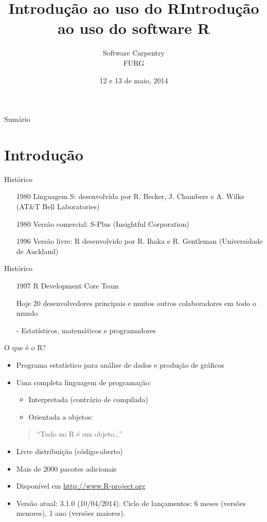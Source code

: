 \documentclass[10pt,handout]{beamer}\usepackage[]{graphicx}\usepackage[]{color}
\title{Introdução ao uso do R}
\title[Módulo I\\ Básico]{Introdução ao uso do software R}
\author{Software Carpentry\\ FURG}
\date{12 e 13 de maio, 2014}
\begin{document}
\begin{frame}
\maketitle
\end{frame}

\begin{frame}{Sumário}
\tableofcontents
\end{frame}

\section{Introdução}

\begin{frame}{Histórico}
\begin{itemize}
\item[1980] Linguagem S: desenvolvida por R. Becker, J. Chambers e
  A. Wilks (AT\&T Bell Laboratories)
\item[1980] Versão comercial: S-Plus (Insightful Corporation)
\item[1996] Versão livre: R desenvolvido por R. Ihaka e R. Gentleman
  (Universidade de Auckland)
\end{itemize}
\end{frame}

\begin{frame}{Histórico}
\begin{itemize}
\item[1997] R Development Core Team
\item[Hoje] 20 desenvolvedores principais e muitos outros colaboradores
  em todo o mundo
\item[-] Estatísticos, matemáticos e programadores
\end{itemize}
\end{frame}

\begin{frame}{O que é o R?}
\begin{itemize}
\item Programa estatístico para análise de dados e produção de
  gráficos\pause
\item Uma completa linguagem de programação:
    \begin{itemize}
    \item Interpretada (contrário de compilada)\pause
    \item Orientada a objetos:
    \end{itemize}
\begin{quote}
    ``Tudo no R é um objeto\ldots''
\end{quote}\pause
\item Livre distribuição (código-aberto)\pause
\item Mais de 2000 pacotes adicionais\pause
\item Disponível em \url{http://www.R-project.org} \pause
\item Versão atual: 3.1.0 (10/04/2014). Ciclo de lançamentos: 6 meses
  (versões menores), 1 ano (versões maiores).
\end{itemize}
\end{frame}
\end{document}
